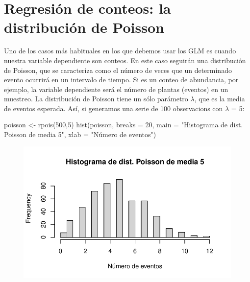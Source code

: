 \documentclass[
  letterpaper,
  DIV=11,
  numbers=noendperiod]{scrreprt}
\newenvironment{Shaded}{\begin{snugshade}}{\end{snugshade}}
\newcommand{\AttributeTok}[1]{\textcolor[rgb]{0.40,0.45,0.13}{#1}}
\newcommand{\DecValTok}[1]{\textcolor[rgb]{0.68,0.00,0.00}{#1}}
\newcommand{\FunctionTok}[1]{\textcolor[rgb]{0.28,0.35,0.67}{#1}}
\newcommand{\NormalTok}[1]{\textcolor[rgb]{0.00,0.23,0.31}{#1}}
\newcommand{\OtherTok}[1]{\textcolor[rgb]{0.00,0.23,0.31}{#1}}
\newcommand{\StringTok}[1]{\textcolor[rgb]{0.13,0.47,0.30}{#1}}
\begin{document}
\hypertarget{regresiuxf3n-de-conteos-la-distribuciuxf3n-de-poisson}{%
\section{Regresión de conteos: la distribución de
Poisson}\label{regresiuxf3n-de-conteos-la-distribuciuxf3n-de-poisson}}

Uno de los casos más habituales en los que debemos usar los GLM es
cuando nuestra variable dependiente son conteos. En este caso seguirán
una distribución de Poisson, que se caracteriza como el número de veces
que un determinado evento ocurrirá en un intervalo de tiempo. Si es un
conteo de abundancia, por ejemplo, la variable dependiente será el
número de plantas (eventos) en un muestreo. La distribución de Poisson
tiene un sólo parámetro \(\lambda\), que es la media de eventos
esperada. Así, si generamos una serie de 100 observacions con
\(\lambda\) = 5:

\begin{Shaded}
\begin{Highlighting}[]
\NormalTok{poisson }\OtherTok{\textless{}{-}} \FunctionTok{rpois}\NormalTok{(}\DecValTok{500}\NormalTok{,}\DecValTok{5}\NormalTok{)}
\FunctionTok{hist}\NormalTok{(poisson, }\AttributeTok{breaks =} \DecValTok{20}\NormalTok{, }\AttributeTok{main =} \StringTok{"Histograma de dist. Poisson de media 5"}\NormalTok{, }\AttributeTok{xlab =} \StringTok{"Número de eventos"}\NormalTok{)}
\end{Highlighting}
\end{Shaded}

\begin{figure}[H]

{\centering \includegraphics{02_GLM_files/figure-pdf/unnamed-chunk-1-1.pdf}

}

\end{figure}
\end{document}
